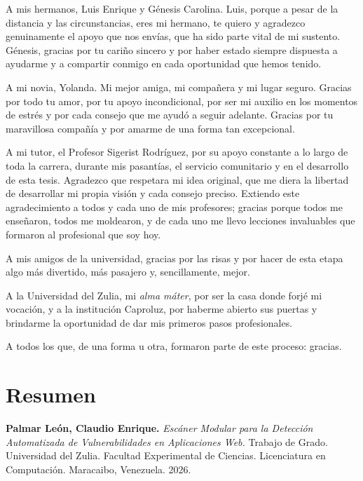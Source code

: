 \documentclass[12pt, a4paper]{article}
\begin{document}
A mis hermanos, Luis Enrique y Génesis Carolina. Luis, porque a pesar de la distancia y las circunstancias, eres mi hermano, te quiero y agradezco genuinamente el apoyo que nos envías, que ha sido parte vital de mi sustento. Génesis, gracias por tu cariño sincero y por haber estado siempre dispuesta a ayudarme y a compartir conmigo en cada oportunidad que hemos tenido.

A mi novia, Yolanda. Mi mejor amiga, mi compañera y mi lugar seguro. Gracias por todo tu amor, por tu apoyo incondicional, por ser mi auxilio en los momentos de estrés y por cada consejo que me ayudó a seguir adelante. Gracias por tu maravillosa compañía y por amarme de una forma tan excepcional.

A mi tutor, el Profesor Sigerist Rodríguez, por su apoyo constante a lo largo de toda la carrera, durante mis pasantías, el servicio comunitario y en el desarrollo de esta tesis. Agradezco que respetara mi idea original, que me diera la libertad de desarrollar mi propia visión y cada consejo preciso. Extiendo este agradecimiento a todos y cada uno de mis profesores; gracias porque todos me enseñaron, todos me moldearon, y de cada uno me llevo lecciones invaluables que formaron al profesional que soy hoy.

A mis amigos de la universidad, gracias por las risas y por hacer de esta etapa algo más divertido, más pasajero y, sencillamente, mejor.

A la Universidad del Zulia, mi \textit{alma máter}, por ser la casa donde forjé mi vocación, y a la institución Caproluz, por haberme abierto sus puertas y brindarme la oportunidad de dar mis primeros pasos profesionales.

A todos los que, de una forma u otra, formaron parte de este proceso: gracias.

\newpage
\section*{Resumen}

\textbf{Palmar León, Claudio Enrique.} \textit{Escáner Modular para la Detección
Automatizada de Vulnerabilidades en Aplicaciones Web.} Trabajo de Grado.
Universidad del Zulia. Facultad Experimental de Ciencias. Licenciatura en
Computación. Maracaibo, Venezuela. 2026.

\vspace{0.5cm}
\end{document}
